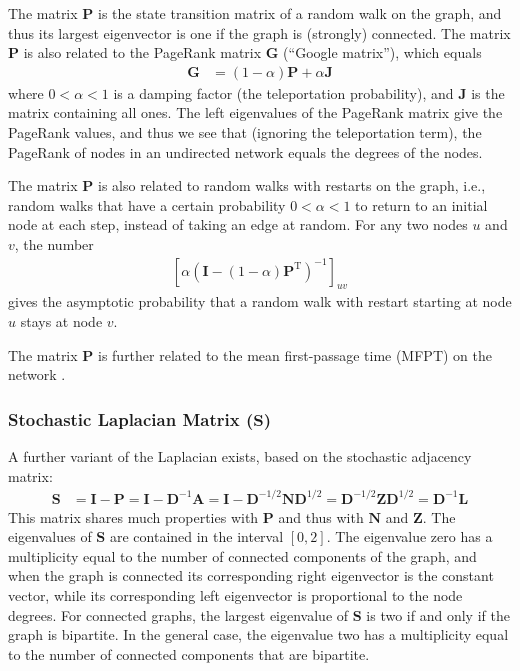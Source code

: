 \documentclass{article}
\begin{document}
The matrix $\mathbf P$ is the state transition matrix of a random walk
on the graph, and thus its largest eigenvector is one if the graph is
(strongly) connected.  
The matrix $\mathbf P$ is also related to the PageRank matrix $\mathbf
G$ (``Google matrix''), which
equals 
\begin{align*}
  \mathbf G &= (1-\alpha) \mathbf P + \alpha\mathbf J
\end{align*}
where $0 < \alpha < 1$ is a damping factor (the teleportation
probability), and $\mathbf J$ is the matrix containing all ones.  The
left 
eigenvalues of the PageRank matrix give the PageRank values, and thus
we see that (ignoring the teleportation term), the PageRank of nodes in
an undirected network equals the degrees of the nodes. 

The matrix $\mathbf P$ is also related to random walks with restarts on
the graph, i.e., random walks that have a certain probability $0 <
\alpha < 1$
to return to an initial node at each step, instead of taking an edge at
random.  For any two nodes $u$ and $v$, the number
\begin{align}
  \left[\alpha  (\mathbf I - (1-\alpha) \mathbf P^{\mathrm T})^{-1}\right]_{uv}
\end{align}
gives the asymptotic probability that a random walk with restart starting at node $u$
stays at node $v$.  

The matrix $\mathbf P$ is further related to the mean first-passage time
(MFPT) on the network \citep{b880}.

\subsubsection{Stochastic Laplacian Matrix ($\mathbf S$)}
A further variant of the Laplacian exists, based on the stochastic
adjacency matrix:
\begin{align*}
  \mathbf S &= \mathbf I - \mathbf P = \mathbf I - \mathbf D^{-1}
  \mathbf A = \mathbf I - \mathbf D^{-1/2} \mathbf N \mathbf D^{1/2} =
  \mathbf D^{-1/2} \mathbf Z \mathbf D^{1/2}
  = \mathbf D^{-1} \mathbf L
\end{align*}
This matrix shares much properties with $\mathbf P$ and thus with
$\mathbf N$ and $\mathbf Z$.  The eigenvalues of $\mathbf S$ are
contained in the interval $[0, 2]$.  The eigenvalue zero has a
multiplicity equal to the number of connected components of the graph,
and when the graph is connected its corresponding right eigenvector is the
constant vector, while its corresponding left eigenvector is
proportional to the node degrees.  For connected graphs, the largest
eigenvalue of $\mathbf S$ is two if and only if the graph is bipartite.
In the general case, the eigenvalue two has a multiplicity equal to the
number of connected components that are bipartite. 
\end{document}
